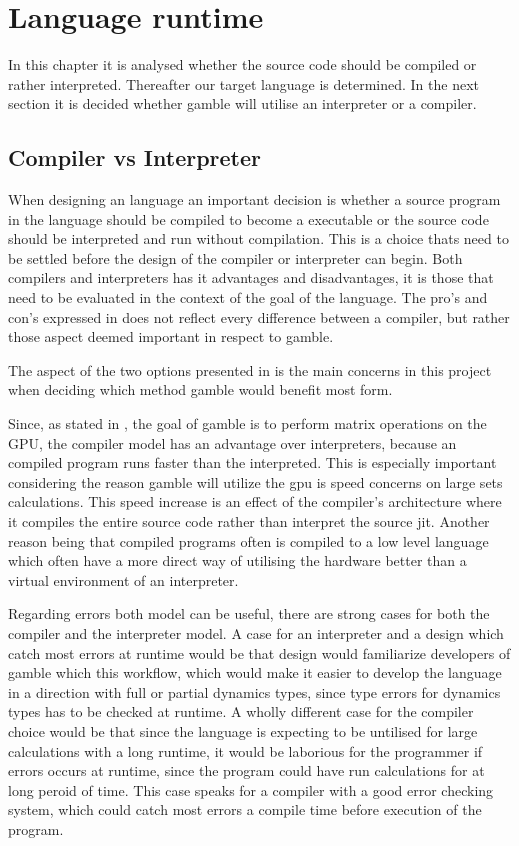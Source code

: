 \chapter{Language runtime}
In this chapter it is analysed whether the source code should be compiled or rather interpreted.
Thereafter our target language is determined.
In the next section it is decided whether \gls{gamble} will utilise an interpreter or a compiler.

\section{Compiler vs Interpreter}
When designing an language an important decision is whether a source program in the language should be compiled to become a executable or the source code should be interpreted and run without compilation.
This is a choice thats need to be settled before the design of the compiler or interpreter can begin.
Both compilers and interpreters has it advantages and disadvantages, it is those that need to be evaluated in the context of the goal of the language.
The pro's and con's expressed in  does not reflect every difference between a compiler, but rather those aspect deemed important in respect to \gls{gamble}.



The aspect of the two options presented in  is the main concerns in this project when deciding which method \gls{gamble} would benefit most form.

Since, as stated in , the goal of \gls{gamble} is to perform matrix operations on the GPU, the compiler model has an advantage over interpreters, because an compiled program runs faster than the interpreted. 
This is especially important considering the reason \gls{gamble} will utilize the \acrshort{gpu} is speed concerns on large sets calculations.
This speed increase is an effect of the compiler's architecture where it compiles the entire source code rather than interpret the source \acrfull{jit}.
Another reason being that compiled programs often is compiled to a low level language which often have a more direct way of utilising the hardware better than a virtual environment of an interpreter.

Regarding errors both model can be useful, there are strong cases for both the compiler and the interpreter model.
A case for an interpreter and a design which catch most errors at runtime would be that design would familiarize developers of \gls{gamble} which this workflow, which would make it easier to develop the language in a direction with full or partial dynamics types, since type errors for dynamics types has to be checked at runtime.
A wholly different case for the compiler choice would be that since the language is expecting to be untilised for large calculations with a long runtime, it would be laborious for the programmer if errors occurs at runtime, since the program could have run calculations for at long peroid of time.
This case speaks for a compiler with a good error checking system, which could catch most errors a compile time before execution of the program.\citep{Sebesta, Crafting_book}

